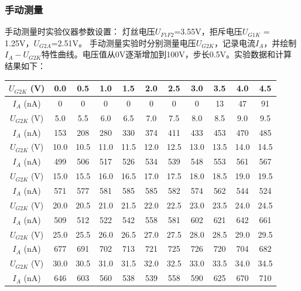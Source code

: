 \documentclass[10pt,a4paper]{ctexart}
\begin{document}
\subsubsection{手动测量}
手动测量时实验仪器参数设置：
灯丝电压$U_{F1F2}$=3.55V，拒斥电压$U_{G1K}$ = 1.25V，$U_{G2A}$=2.51V。
手动测量实验时分别测量电压$U_{G2K}$，记录电流$I_A$，并绘制$I_A-U_{G2K}$特性曲线。电压值从0V逐渐增加到100V，步长0.5V。实验数据和计算结果如下：
\begin{table}[H]
    \centering
    \begin{tabular}{|c|c|c|c|c|c|c|c|c|c|c|}
        \hline
        $U_{G2K}$ (V) & 0.0 & 0.5 & 1.0 & 1.5 & 2.0 & 2.5 & 3.0 & 3.5 & 4.0 & 4.5 \\ 
        \hline
        $I_A$ (nA)     & 0   & 0   & 0   & 0   & 0   & 0   & 0   & 13  & 47  & 91  \\ 
        \hline
        $U_{G2K}$ (V) & 5.0 & 5.5 & 6.0 & 6.5 & 7.0 & 7.5 & 8.0 & 8.5 & 9.0 & 9.5 \\ 
        \hline
        $I_A$ (nA)     & 153 & 208 & 280 & 330 & 374 & 411 & 433 & 453 & 470 & 485 \\ 
        \hline
        $U_{G2K}$ (V) & 10.0 & 10.5 & 11.0 & 11.5 & 12.0 & 12.5 & 13.0 & 13.5 & 14.0 & 14.5 \\ 
        \hline
        $I_A$ (nA)     & 499  & 506  & 517  & 526  & 534  & 539  & 548  & 553  & 561  & 567  \\ 
        \hline
        $U_{G2K}$ (V) & 15.0 & 15.5 & 16.0 & 16.5 & 17.0 & 17.5 & 18.0 & 18.5 & 19.0 & 19.5 \\ 
        \hline
        $I_A$ (nA)     & 571  & 577  & 581  & 585  & 585  & 582  & 574  & 562  & 544  & 524  \\ 
        \hline
        $U_{G2K}$ (V) & 20.0 & 20.5 & 21.0 & 21.5 & 22.0 & 22.5 & 23.0 & 23.5 & 24.0 & 24.5 \\ 
        \hline
        $I_A$ (nA)     & 509  & 512  & 522  & 542  & 558  & 581  & 602  & 621  & 642  & 661  \\ 
        \hline
        $U_{G2K}$ (V) & 25.0 & 25.5 & 26.0 & 26.5 & 27.0 & 27.5 & 28.0 & 28.5 & 29.0 & 29.5 \\ 
        \hline
        $I_A$ (nA)     & 677  & 691  & 702  & 713  & 721  & 725  & 726  & 720  & 704  & 682  \\ 
        \hline
        $U_{G2K}$ (V) & 30.0 & 30.5 & 31.0 & 31.5 & 32.0 & 32.5 & 33.0 & 33.5 & 34.0 & 34.5 \\ 
        \hline
        $I_A$ (nA)     & 646  & 603  & 560  & 538  & 539  & 558  & 590  & 625  & 670  & 710  \\ 

\end{tabular}
\end{table}
\end{document}
